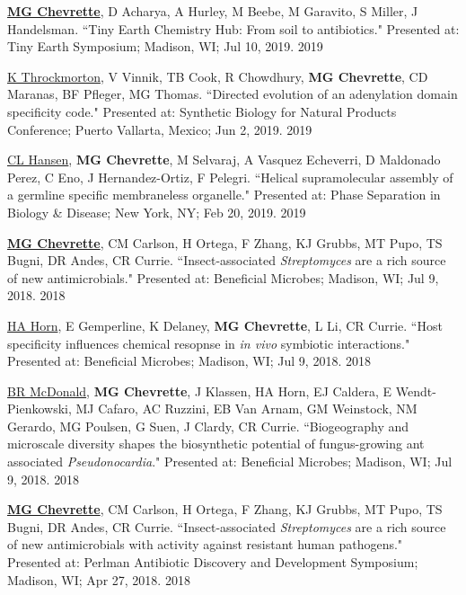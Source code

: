 
\begin{cvpubs}

\cvpub
{\underline{\textbf{MG Chevrette}}, D Acharya, A Hurley, M Beebe, M Garavito, S Miller, J Handelsman. ``Tiny Earth Chemistry Hub: From soil to antibiotics." Presented at: Tiny Earth Symposium; Madison, WI; Jul 10, 2019.}
{2019}

\cvpub
{\underline{K Throckmorton}, V Vinnik, TB Cook, R Chowdhury, \textbf{MG Chevrette}, CD Maranas, BF Pfleger, MG Thomas. ``Directed evolution of an adenylation domain specificity code." Presented at: Synthetic Biology for Natural Products Conference; Puerto Vallarta, Mexico; Jun 2, 2019.}
{2019}

\cvpub
{\underline{CL Hansen}, \textbf{MG Chevrette}, M Selvaraj, A Vasquez Echeverri, D Maldonado Perez, C Eno, J Hernandez-Ortiz, F Pelegri. ``Helical supramolecular assembly of a germline specific membraneless organelle." Presented at: Phase Separation in Biology \& Disease; New York, NY; Feb 20, 2019.}
{2019}

\cvpub
{\underline{\textbf{MG Chevrette}}, CM Carlson, H Ortega, F Zhang, KJ Grubbs, MT Pupo, TS Bugni, DR Andes, CR Currie. ``Insect-associated \textit{Streptomyces} are a rich source of new antimicrobials." Presented at: Beneficial Microbes; Madison, WI; Jul 9, 2018.}
{2018}

\cvpub
{\underline{HA Horn}, E Gemperline, K Delaney, \textbf{MG Chevrette}, L Li, CR Currie. ``Host specificity influences chemical resopnse in \textit{in vivo} symbiotic interactions." Presented at: Beneficial Microbes; Madison, WI; Jul 9, 2018.}
{2018}

\end{cvpubs} \begin{cvpubs}

\cvpub
{\underline{BR McDonald}, \textbf{MG Chevrette}, J Klassen, HA Horn, EJ Caldera, E Wendt-Pienkowski, MJ Cafaro, AC Ruzzini, EB Van Arnam, GM Weinstock, NM Gerardo, MG Poulsen, G Suen, J Clardy, CR Currie. ``Biogeography and microscale diversity shapes the biosynthetic potential of fungus-growing ant associated \textit{Pseudonocardia}." Presented at: Beneficial Microbes; Madison, WI; Jul 9, 2018.}
{2018}

\cvpub
{\underline{\textbf{MG Chevrette}}, CM Carlson, H Ortega, F Zhang, KJ Grubbs, MT Pupo, TS Bugni, DR Andes, CR Currie. ``Insect-associated \textit{Streptomyces} are a rich source of new antimicrobials with activity against resistant human pathogens." Presented at: Perlman Antibiotic Discovery and Development Symposium; Madison, WI; Apr 27, 2018.}
{2018}


\end{cvpubs}
